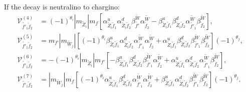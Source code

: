 \documentclass[final,3p,times]{elsarticle}
\begin{document}
If the decay is neutralino to chargino:
\begin{align}
\mathcal{V}_{\tilde{f'}_1 \tilde{f}_2}^{(4)} &= (-1)^{\theta_i} |m_{\tilde{Z}_i}|m_{f}\left[\alpha_{\tilde{Z}_i \tilde{f}_1}^{u} \alpha_{\tilde{Z}_i \tilde{f}_2}^{d} \beta_{\tilde{f'}}^{\tilde{W}}\alpha_{\tilde{f}_2}^{\tilde{W}} -  \beta_{\tilde{Z}_i \tilde{f}_1}^{u} \beta_{\tilde{Z}_i \tilde{f}_2}^{d} \alpha_{\tilde{f'}_1}^{\tilde{W}} \beta_{\tilde{f}_2}^{\tilde{W}}\right], \\
\mathcal{V}_{\tilde{f'}_1 \tilde{f}_2}^{(5)} &= m_{f'} |m_{\tilde{W}_j}|\left[(-1)^{\theta_i} \beta_{\tilde{Z}_i \tilde{f}_1}^{u} \alpha_{\tilde{Z}_i \tilde{f}_2}^{d} \alpha_{\tilde{f'}_1}^{\tilde{W}} \alpha_{\tilde{f}_2}^{\tilde{W}} + \alpha_{\tilde{Z}_i \tilde{f}_1}^{u} \beta_{\tilde{Z}_i \tilde{f}_2}^{d} \beta_{\tilde{f'}_1}^{\tilde{W}} \beta_{\tilde{f}_2}^{\tilde{W}}\right](-1)^{\theta_j}, \\
\mathcal{V}_{\tilde{f'}_1 \tilde{f}_2}^{(6)} &= -(-1)^{\theta_i} |m_{\tilde{Z}_i}| m_{f'} \left[-\beta_{\tilde{Z}_i \tilde{f}_1}^{u} \beta_{\tilde{Z}_i \tilde{f}_2}^{d} \beta_{\tilde{f'}_1}^{\tilde{W}} \alpha_{\tilde{f}_2}^{\tilde{W}} +  \alpha_{\tilde{Z}_i \tilde{f}_1}^{u} \alpha_{\tilde{Z}_i \tilde{f}_2}^{d} \alpha_{\tilde{f'}_1}^{\tilde{W}} \beta_{\tilde{f}_2}^{\tilde{W}}\right], \\
\mathcal{V}_{\tilde{f'}_1 \tilde{f}_2}^{(7)} &= |m_{\tilde{W}_j}|m_{f}\left[(-1)^{\theta_i} \alpha_{\tilde{Z}_i \tilde{f}_1}^{u} \beta_{\tilde{Z}_i \tilde{f}_2}^{d} \alpha_{\tilde{f'}_1}^{\tilde{W}} \alpha_{\tilde{f}_2}^{\tilde{W}} + \beta_{\tilde{Z}_i \tilde{f}_1}^{u} \alpha_{\tilde{Z}_i \tilde{f}_2}^{d} \beta_{\tilde{f'}_1}^{\tilde{W}} \beta_{\tilde{f}_2}^{\tilde{W}}\right](-1)^{\theta_j}.
\end{align}
\end{document}
